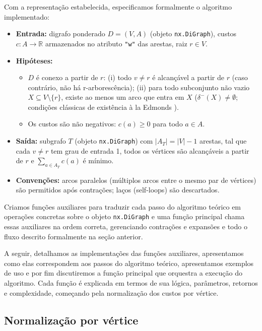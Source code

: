 Com a representação estabelecida, especificamos formalmente o algoritmo implementado:

\begin{itemize}\setlength{\itemsep}{2pt}
    \item \textbf{Entrada:} digrafo ponderado \(D=(V,A)\) (objeto \texttt{nx.DiGraph}), custos \(c:A\to\mathbb{R}\) armazenados no atributo \texttt{"w"} das arestas, raiz \(r\in V\).
    \item \textbf{Hipóteses:}
          \begin{itemize}\setlength{\itemsep}{2pt}
              \item \(D\) é conexo a partir de \(r\): (i) todo \(v\neq r\) é alcançável a partir de \(r\) (caso contrário, não há r-arborescência); (ii) para todo subconjunto não vazio \(X\subseteq V\setminus\{r\}\), existe ao menos um arco que entra em \(X\) (\(\delta^-(X)\neq\emptyset\); condições clássicas de existência \`a la Edmonds \cite{schrijver2003comb}).
              \item Os custos são não negativos: \(c(a)\ge 0\) para todo \(a\in A\).
          \end{itemize}
    \item \textbf{Saída:} subgrafo \(T\) (objeto \texttt{nx.DiGraph}) com \(|A_T|=|V|-1\) arestas, tal que cada \(v\neq r\) tem grau de entrada 1, todos os vértices são alcançáveis a partir de \(r\) e \(\sum_{a\in A_T} c(a)\) é mínimo.
    \item \textbf{Convenções:} arcos paralelos (múltiplos arcos entre o mesmo par de vértices) são permitidos após contrações; laços (self-loops) são descartados.
\end{itemize}

Criamos funções auxiliares para traduzir cada passo do algoritmo teórico em operações concretas sobre o objeto \texttt{nx.DiGraph} e uma função principal chama essas auxiliares na ordem correta, gerenciando contrações e expansões e todo o fluxo descrito formalmente na seção anterior.

A seguir, detalhamos as implementações das funções auxiliares, apresentamos como elas correspondem aos passos do algoritmo teórico, apresentamos exemplos de uso e por fim discutiremos a função principal que orquestra a execução do algoritmo. Cada função é explicada em termos de sua lógica, parâmetros, retornos e complexidade, começando pela normalização dos custos por vértice.

\subsection{Normalização por vértice}

